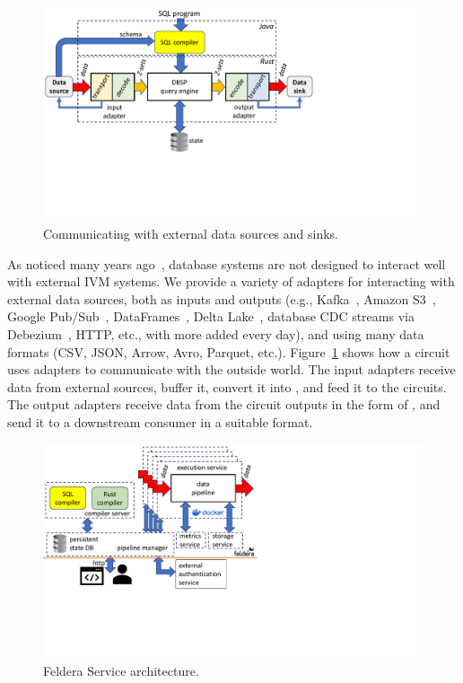 \begin{figure}[h]
  \begin{center}
  \includegraphics[trim={0 2.2inin 3.7in 0},clip,scale=.33]{adapters.pdf}
  \caption{\label{fig:adapters}Communicating with external data
    sources and sinks.}
  \end{center}
\end{figure}

As noticed many years ago~\cite{labio-vldb00}, database systems are
not designed to interact well with external IVM systems.  We provide a
variety of adapters for interacting with external data sources, both
as inputs and outputs (e.g., Kafka~\cite{kreps-netdb11}, Amazon
S3~\cite{palankar-dadc08}, Google Pub/Sub~\cite{pubsub},
DataFrames~\cite{pandas12}, Delta Lake~\cite{armbrust-vldb20},
database CDC streams via Debezium~\cite{debezium}, HTTP, etc., with
more added every day), and using many data formats (CSV, JSON, Arrow,
Avro, Parquet, etc.).  Figure~\ref{fig:adapters} shows how a circuit
uses adapters to communicate with the outside world.  The input
adapters receive data from external sources, buffer it, convert it
into \zrs, and feed it to the circuits.  The output adapters receive
data from the circuit outputs in the form of \zrs, and send it to a
downstream consumer in a suitable format.

\begin{figure}[h]
  \begin{center}
  \includegraphics[trim={0 2.4in 4.3in 0},clip,scale=.44]{services.pdf}
  \caption{\label{fig:service}Feldera Service architecture.}
  \end{center}
\end{figure}

